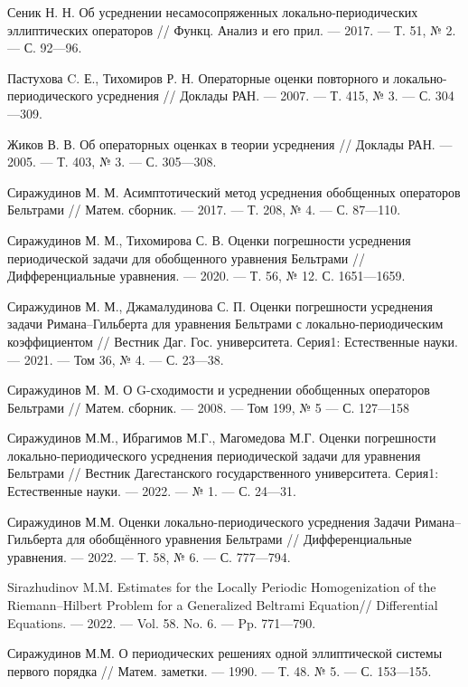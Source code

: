 \begin{thebibliography}{111}
  Сеник Н. Н. Об усреднении несамосопряженных локально-периодических эллиптических операторов // Функц. Анализ и его прил. --- 2017. --- Т. 51, № 2. --- С. 92---96.

  Пастухова C. Е., Тихомиров Р. Н. Операторные оценки повторного  и локально-периодического  усреднения // Доклады РАН. --- 2007. --- Т. 415, № 3. ---  С. 304---309.

  Жиков В. В. Об операторных оценках в теории усреднения // Доклады РАН. --- 2005. --- Т. 403, № 3. --- С. 305---308.

  Сиражудинов М. М. Асимптотический метод усреднения обобщенных  операторов Бельтрами // Матем. сборник. --- 2017. --- Т. 208, № 4. --- С. 87---110.

  Сиражудинов М. М., Тихомирова С. В. Оценки погрешности усреднения периодической задачи для обобщенного уравнения Бельтрами // Дифференциальные уравнения. --- 2020. --- Т. 56, № 12.  С. 1651---1659.

  Сиражудинов М. М., Джамалудинова С. П. Оценки погрешности усреднения задачи Римана–Гильберта для уравнения Бельтрами с локально-периодическим коэффициентом //  Вестник Даг. Гос. университета. Серия1: Естественные науки. --- 2021. --- Том 36, № 4. --- С. 23---38.

  Сиражудинов М. М. О G-сходимости и усреднении обобщенных операторов Бельтрами // Матем. сборник. --- 2008. --- Том 199, № 5 --- С. 127---158

  	Сиражудинов М.М., Ибрагимов М.Г., Магомедова М.Г. Оценки погрешности локально-периодического усреднения периодической задачи для уравнения Бельтрами // Вестник Дагестанского государственного университета. Серия1: Естественные науки. --- 2022. --- № 1. --- С. 24---31.

  	Сиражудинов М.М. Оценки локально-периодического усреднения Задачи Римана–Гильберта для обобщённого уравнения Бельтрами // Дифференциальные уравнения. --- 2022. --- Т. 58, № 6. --- С. 777---794.

  	Sirazhudinov M.M. Estimates for the Locally Periodic Homogenization of the Riemann–Hilbert Problem for a Generalized Beltrami Equation// Differential Equations. --- 2022. --- Vol. 58. No. 6. --- Pp. 771---790.

   Сиражудинов М.М. О периодических решениях одной
  	эллиптической системы первого порядка //  Матем. заметки.
  	--- 1990.  --- Т. 48. № 5. --- С. 153---155.


\end{thebibliography}
